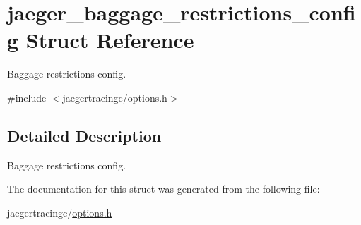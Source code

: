 \hypertarget{structjaeger__baggage__restrictions__config}{}\section{jaeger\+\_\+baggage\+\_\+restrictions\+\_\+config Struct Reference}
\label{structjaeger__baggage__restrictions__config}


Baggage restrictions config.  




{\ttfamily \#include $<$jaegertracingc/options.\+h$>$}



\subsection{Detailed Description}
Baggage restrictions config. 



The documentation for this struct was generated from the following file\+:\begin{DoxyCompactItemize}
\item 
jaegertracingc/\mbox{\hyperlink{options_8h}{options.\+h}}\end{DoxyCompactItemize}
